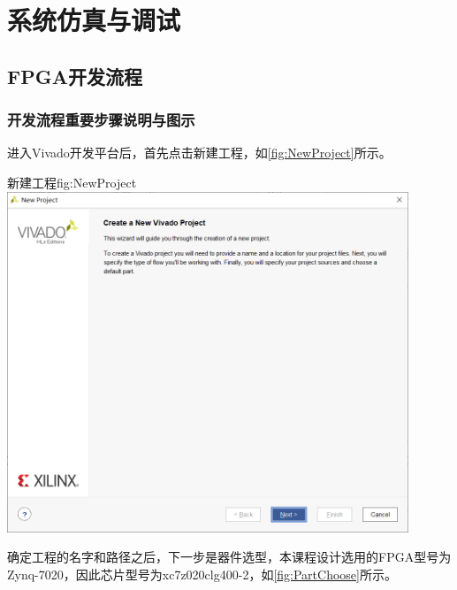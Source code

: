 \documentclass[supercite]{HustGraduPaper}
\begin{document}
	
	\section{系统仿真与调试}
	
	\subsection{FPGA开发流程}
	
	\subsubsection{开发流程重要步骤说明与图示}
	
	进入Vivado开发平台后，首先点击新建工程，如\autoref{fig:NewProject}所示。
	
	\begin{generalfig}[htb]{新建工程}{fig:NewProject}
		\includegraphics[width=12cm]{Figures/NewProject.png}
	\end{generalfig}
	
	
	确定工程的名字和路径之后，下一步是器件选型，本课程设计选用的FPGA型号为Zynq-7020，因此芯片型号为xc7z020clg400-2，如\autoref{fig:PartChoose}所示。
	
\end{document}

